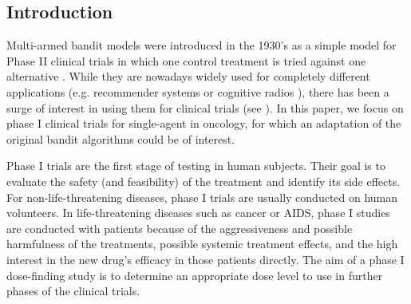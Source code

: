 %

\subsection{Introduction}

Multi-armed bandit models were introduced in the 1930's as a simple model for Phase II clinical trials in which one control treatment is tried against one alternative \citep{Thompson33}. While they are nowadays widely used for completely different applications (e.g. recommender systems \citep{LiCLS10News} or cognitive radios \citep{Anandkumar11}), there has been a surge of interest in using them for clinical trials (see \cite{Villar15BCT}). In this paper, we focus on phase I clinical trials for single-agent in oncology, for which an adaptation of the original bandit algorithms could be of interest.  

Phase I trials are the first stage of testing in human subjects. Their goal is to evaluate the safety (and feasibility) of the treatment and identify its side effects. For non-life-threatening diseases, phase I trials are usually conducted on human volunteers. In life-threatening diseases such as cancer or AIDS, phase I studies are conducted with patients because of the aggressiveness and possible harmfulness of the treatments, possible systemic treatment effects, and the high interest in the new drug's efficacy in those patients directly. The aim of a phase I dose-finding study is to determine an appropriate dose level to use in further phases of the clinical trials. 

